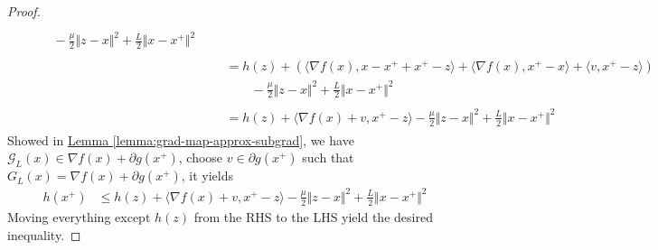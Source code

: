 \documentclass[12pt]{article}
\begin{document}
\begin{proof}
\begin{align*}
\begin{aligned}
                \\ 
                &\qquad 
                - \frac{\mu}{2}\Vert z - x\Vert^2
                + \frac{L}{2}\Vert x - x^+\Vert^2
            \end{aligned}
            \\& 
            \begin{aligned}
                &= h(z) + 
                \left(
                    \langle \nabla f(x), x - x^+ + x^+ - z\rangle + 
                    \langle \nabla f(x), x^+ - x\rangle + 
                    \langle v, x^+ - z\rangle
                \right)
                \\
                &\qquad 
                - \frac{\mu}{2}\Vert z - x\Vert^2
                + \frac{L}{2}\Vert x - x^+\Vert^2
            \end{aligned}
            \\& 
            \begin{aligned}
                &= h(z) + 
                \langle \nabla f(x) + v, x^+ - z\rangle 
                - \frac{\mu}{2}\Vert z - x\Vert^2
                + \frac{L}{2}\Vert x - x^+\Vert^2
            \end{aligned}
        \end{align*}
        Showed in  
        \hyperref[lemma:grad-map-approx-subgrad]{Lemma \ref*{lemma:grad-map-approx-subgrad}}, 
        we have $\mathcal G_L(x) \in \nabla f(x) + \partial g(x^+)$, choose $v \in \partial g(x^+)$ such that $G_L(x) = \nabla f(x) + \partial g(x^+)$, it yields
        \begin{align*}
            h(x^+) & 
            \le h(z) + 
            \langle \nabla f(x) + v, x^+ - z\rangle 
            - \frac{\mu}{2}\Vert z - x\Vert^2
            + \frac{L}{2}\Vert x - x^+\Vert^2
        \end{align*}
        Moving everything except $h(z)$ from the RHS to the LHS yield the desired inequality. 
    \end{proof}
\end{document}
